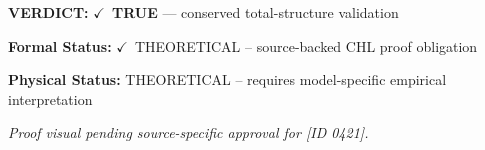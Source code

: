 \textbf{VERDICT:} \ensuremath{\checkmark}\ \textbf{TRUE} --- conserved total-structure validation

\textbf{Formal Status:} \ensuremath{\checkmark}\ THEORETICAL -- source-backed CHL proof obligation

\textbf{Physical Status:} THEORETICAL -- requires model-specific empirical interpretation
\par\vspace{0.45em}
\par
\vfill
\begingroup\footnotesize\itshape
Proof visual pending source-specific approval for [ID 0421].
\par\endgroup
\vfill
\endgroup
\endgroup
